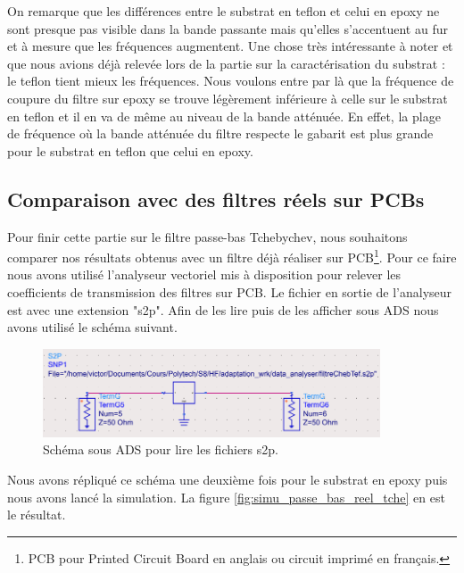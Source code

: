 \documentclass[french]{article}
\begin{document}
On remarque que les différences entre le substrat en teflon et celui en epoxy ne sont presque pas visible dans la bande passante mais  qu'elles s'accentuent au fur et à mesure que les fréquences augmentent. Une chose très intéressante à noter et que nous avions déjà relevée lors de la partie sur la caractérisation du substrat : le teflon tient mieux les fréquences. Nous voulons entre par là que la fréquence de coupure du filtre sur epoxy se trouve légèrement inférieure à celle sur le substrat en teflon et il en va de même au niveau de la bande atténuée. En effet, la plage de fréquence où la bande atténuée du filtre respecte le gabarit est plus grande pour le substrat en teflon que celui en epoxy.


\subsection{Comparaison avec des filtres réels sur PCBs}

Pour finir cette partie sur le filtre passe-bas Tchebychev, nous souhaitons comparer nos résultats obtenus avec un filtre déjà réaliser sur PCB\footnote{PCB pour Printed Circuit Board en anglais ou circuit imprimé en français.}. Pour ce faire nous avons utilisé l'analyseur vectoriel mis à disposition pour relever les coefficients de transmission des filtres sur PCB. Le fichier en sortie de l'analyseur est avec une extension "s2p". Afin de les lire puis de les afficher sous ADS nous avons utilisé le schéma suivant.

\begin{figure}[H]
	\centering
	\includegraphics[width=10cm]{photo/passe_bas_vic/montage_filtre_reel_ADS.png}
	\caption{Schéma sous ADS pour lire les fichiers s2p.}
	\label{fig:montage_filtre_reel_ADS}
\end{figure}

Nous avons répliqué ce schéma une deuxième fois pour le substrat en epoxy puis nous avons lancé la simulation. La figure \ref{fig:simu_passe_bas_reel_tche} en est le résultat.
\end{document}
